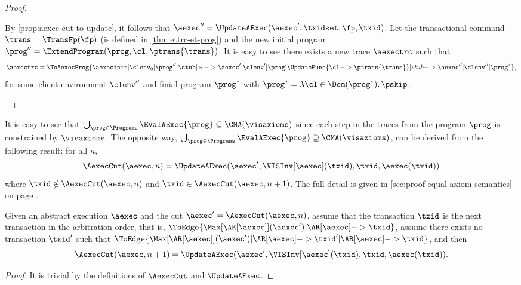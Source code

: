 \begin{proof}
\begin{enumerate}
\begin{enumerate}
        By \cref{prop:aexec-cut-to-update}, it follows that \( \aexec'' = \UpdateAExec(\aexec',\txidset,\fp,\txid) \).
        Let the transactional command \( \trans = \TransFp(\fp) \) (\TransFp is defined in \cref{thm:ettrc-et-prog})
        and the new initial program \( \prog'' = \ExtendProgram(\prog,\cl,\ptrans{\trans}) \).
        It is easy to see there exists a new trace \( \aexectrc \) such that
        \[
            \aexectrc = \ToAexecProg{ \aexecinit | \clenv_0 | \prog'' | \stub | * 
                -> \aexec' | \clenv' | \prog'\UpdateFunc{\cl -> \ptrans{\trans} } | stub -> \aexec'' | \clenv'' | \prog^* } ,
        \]
        for some client environment \( \clenv'' \) and finial program \( \prog^* \) 
        with \( \prog^* = \lambda \cl \in \Dom(\prog^*) \ldotp \pskip \). \qedhere
    \end{enumerate}
\end{enumerate}
\end{proof}
\begin{proofsketch}
It is easy to see that \( \bigcup_{\prog \in \Programs} \EvalAExec{\prog} \subseteq \CMA(\visaxioms)\)
since each step in the traces from the program \( \prog \) is constrained by \( \visaxioms \).
The opposite way,  \( \bigcup_{\prog \in \Programs} \EvalAExec{\prog} \supseteq \CMA(\visaxioms)\),
can be derived from the following result: for all \( n \),
\[ \AexecCut(\aexec,n) = \UpdateAExec(\aexec',\VISInv[\aexec](\txid),\txid,\aexec(\txid)) \]
where \( \txid \notin \AexecCut(\aexec,n) \) and \(  \txid \in \AexecCut(\aexec,n+1) \).
The full detail is given in \cref{sec:proof-equal-axiom-semantics} 
on page \pageref{sec:proof-equal-axiom-semantics}.
\end{proofsketch}

\begin{toappendix}
\label{sec:proof-aexec-cut-to-trace}
\begin{proposition}
\label{prop:aexec-cut-to-update}
Given an abstract execution \( \aexec \) and the cut \( \aexec' = \AexecCut(\aexec,n) \),
assume that the transaction \( \txid \) is the next transaction in the arbitration order,
that is, \( \ToEdge{ \Max[\AR[\aexec]](\aexec') | \AR[\aexec] -> \txid }\),
assume there exists no transaction \( \txid' \) such that 
\( \ToEdge{ \Max[\AR[\aexec]](\aexec') | \AR[\aexec] -> \txid' | \AR[\aexec] -> \txid  }\),
and then
\[ \AexecCut(\aexec,n+1) = \UpdateAExec(\aexec',\VISInv[\aexec](\txid),\txid,\aexec(\txid)) . \]
\end{proposition}
\begin{proof}
    It is trivial by the definitions of \( \AexecCut\) and \( \UpdateAExec \).
\end{proof}
\end{toappendix}
